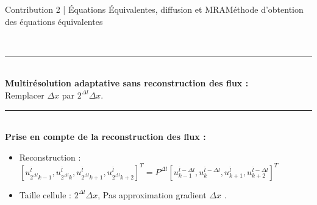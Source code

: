 \begin{frame}{Contribution 2 | Équations Équivalentes, diffusion et MRA}{Méthode d'obtention des équations équivalentes}
\\ \pause
    \noindent\color{Primary}\rule{\linewidth}{0.6pt}\color{black}\\
    \textbf{Multirésolution adaptative sans reconstruction des flux :}\\
    Remplacer $\Delta x$ par $2^{\Delta l} \Delta x$.\\ \pause
    \noindent\color{Primary}\rule{\linewidth}{0.6pt}\color{black}\\
    \textbf{Prise en compte de la reconstruction des flux :}\\
    \begin{itemize}
        \item Reconstruction : \small$\left[ u^{\overline l}_{2^{\Delta l}k-1} ,  u^{\overline l}_{2^{\Delta l}k}  ,  u^{\overline l}_{2^{\Delta l}k+1} ,  u^{\overline l}_{2^{\Delta l}k+2} \right]^T= P^{\Delta l} \left[ u^{\overline l- \Delta l}_{k-1} ,  u^{\overline l - \Delta l}_{k}  ,  u^{\overline l}_{k+1} ,  u^{\overline l - \Delta l}_{k+2} \right]^T$\normalsize
        \item Taille cellule : $2^{\Delta l} \Delta x$, Pas approximation gradient $\Delta x$ .
    \end{itemize}
\end{frame}